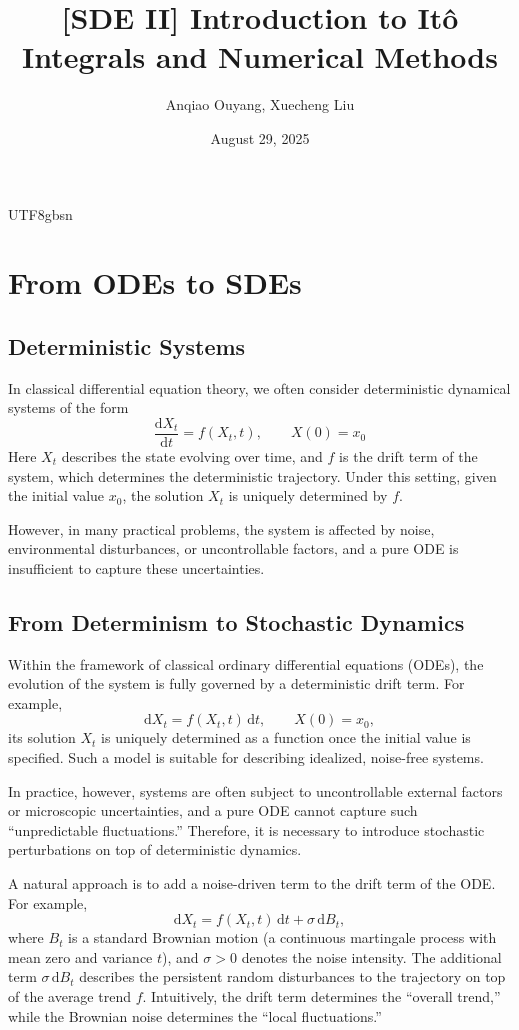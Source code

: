 \documentclass{article}
\title{[SDE II] Introduction to Itô Integrals and Numerical Methods}
\author{Anqiao Ouyang, Xuecheng Liu}
\date{August 29, 2025}
\begin{document}
\begin{CJK*}{UTF8}{gbsn}

\maketitle

\section{From ODEs to SDEs}
\subsection{Deterministic Systems}

In classical differential equation theory, we often consider deterministic dynamical systems of the form
\[
  \frac{\mathrm{d}X_t}{\mathrm{d}t} = f(X_t,t), \qquad X(0)=x_0
\]
Here $X_t$ describes the state evolving over time, and $f$ is the drift term of the system, which determines the deterministic trajectory.  
Under this setting, given the initial value $x_0$, the solution $X_t$ is uniquely determined by $f$.

However, in many practical problems, the system is affected by noise, environmental disturbances, or uncontrollable factors, and a pure ODE is insufficient to capture these uncertainties.

\subsection{From Determinism to Stochastic Dynamics}

Within the framework of classical ordinary differential equations (ODEs), the evolution of the system is fully governed by a deterministic drift term. For example,
\[
  \mathrm{d}X_t = f(X_t,t)\,\mathrm{d}t, \qquad X(0)=x_0,
\]
its solution $X_t$ is uniquely determined as a function once the initial value is specified. Such a model is suitable for describing idealized, noise-free systems.

In practice, however, systems are often subject to uncontrollable external factors or microscopic uncertainties, and a pure ODE cannot capture such “unpredictable fluctuations.” Therefore, it is necessary to introduce stochastic perturbations on top of deterministic dynamics.

\medskip
A natural approach is to add a noise-driven term to the drift term of the ODE. For example,
\[
  \mathrm{d}X_t = f(X_t,t)\,\mathrm{d}t + \sigma\,\mathrm{d}B_t,
\]
where $B_t$ is a standard Brownian motion (a continuous martingale process with mean zero and variance $t$), and $\sigma>0$ denotes the noise intensity. The additional term $\sigma\,\mathrm{d}B_t$ describes the persistent random disturbances to the trajectory on top of the average trend $f$. Intuitively, the drift term determines the “overall trend,” while the Brownian noise determines the “local fluctuations.”


\end{CJK*}
\end{document}

